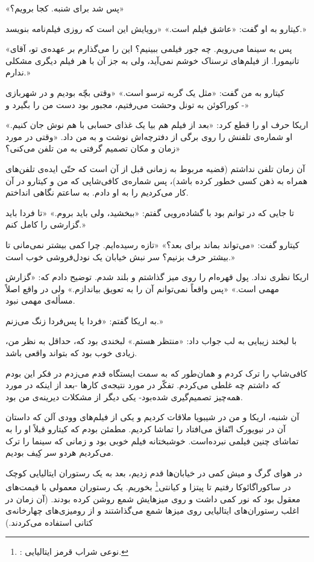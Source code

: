 \documentclass[a5paper]{book}
\begin{document}
«پس شد برای شنبه. کجا برویم؟»

کیتارو به او گفت: «عاشق فیلم است.» «رویایش این است که روزی فیلم‌نامه بنویسد.»

«پس به سینما می‌رویم. چه جور فیلمی ببینیم؟ این را می‌گذارم بر عهده‌ی تو، آقای تانیمورا. از فیلم‌های ترسناک خوشم نمی‌آید، ولی به جز آن با هر فیلم دیگری مشکلی ندارم.»

کیتارو به من گفت: «مثل یک گربه ترسو است.» «وقتی بچّه بودیم و در شهربازی کوراکوئن به تونل وحشت می‌رفتیم، مجبور بود دست من را بگیرد و -»

اریکا حرف او را قطع کرد: «بعد از فیلم هم بیا یک غذای حسابی با هم نوش جان کنیم.»  او شماره‌ی تلفنش را روی برگی از دفترچه‌اش نوشت و به من داد. «وقتی در مورد زمان و مکان تصمیم گرفتی به من تلفن می‌کنی؟»

آن زمان تلفن نداشتم (قضیه مربوط به زمانی قبل از آن است که حتّی ایده‌ی تلفن‌های همراه به ذهن کسی خطور کرده باشد)، پس شماره‌ی کافی‌شاپی که من و کیتارو در آن کار می‌کردیم را به او دادم. به ساعتم نگاهی انداختم.

تا جایی که در توانم بود با گشاده‌رویی گفتم: «ببخشید، ولی باید بروم.» «تا فردا باید گزارشی را کامل کنم.»

کیتارو گفت: «می‌تواند بماند برای بعد؟» «تازه رسیده‌ایم. چرا کمی بیشتر نمی‌مانی تا بیشتر حرف بزنیم؟ سر نبش خیابان یک نودل‌فروشی خوب است.»

اریکا نظری نداد. پول قهره‌ام را روی میز گذاشتم و بلند شدم. توضیح دادم که: «گزارش مهمی است.» «پس واقعاً نمی‌توانم آن را به تعویق بیاندازم.» ولی در واقع اصلاً مسأله‌ی مهمی نبود.

به اریکا گفتم: «فردا یا پس‌فردا زنگ می‌زنم.»

با لبخند زیبایی به لب جواب داد: «منتظر هستم.» لبخندی بود که، حداقل به نظر من، زیادی خوب بود که بتواند واقعی باشد.

کافی‌شاپ را ترک کردم و همان‌طور که به سمت ایستگاه قدم می‌زدم در فکر این بودم که داشتم چه غلطی می‌کردم. تفکّر در مورد نتیجه‌ی کارها -بعد از اینکه در مورد همه‌چیز تصمیم‌گیری شده‌بود- یکی دیگر از مشکلات دیرینه‌ی من بود.

آن شنبه، اریکا و من در شیبویا ملاقات کردیم و یکی از فیلم‌های وودی آلن که داستان آن در نیو‌یورک اتّفاق می‌افتاد را تماشا کردیم. مطمئن بودم که کیتارو قبلاً او را به تماشای چنین فیلمی نبرده‌است. خوشبختانه فیلم خوبی بود و زمانی که سینما را ترک می‌کردیم هردو سر کِیف بودیم.

در هوای گرگ و میش کمی در خیابان‌ها قدم زدیم، بعد به یک رستوران ایتالیایی کوچک در ساکوراگائوکا رفتیم تا پیتزا و کیانتی\footnote{
: نوعی شراب قرمز ایتالیایی.} 
بخوریم. یک رستوران معمولی با قیمت‌های معقول بود که نور کمی داشت و روی میزهایش شمع روشن کرده بودند. (آن زمان در اغلب رستوران‌های ایتالیایی روی میزها شمع می‌گذاشتند و از رومیزی‌های چهارخانه‌ی کتانی استفاده می‌کردند.) 
\end{document}
